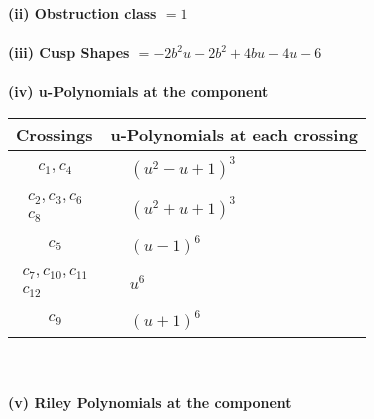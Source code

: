 \documentclass[1p]{elsarticle_modified}
\theoremstyle{definition}
\begin{document}
\flushleft \textbf{(ii) Obstruction class $= 1$}\\~\\
\flushleft \textbf{(iii) Cusp Shapes $= -2 b^2 u-2 b^2+4 b u-4 u-6$}\\~\\
\newpage\renewcommand{\arraystretch}{1}
\flushleft \textbf{(iv) u-Polynomials at the component}\newline \\
\begin{tabular}{m{50pt}|m{274pt}}
Crossings & \hspace{64pt}u-Polynomials at each crossing \\
\hline $$\begin{aligned}c_{1},c_{4}\end{aligned}$$&$\begin{aligned}
&(u^2- u+1)^3
\end{aligned}$\\
\hline $$\begin{aligned}c_{2},c_{3},c_{6}\\c_{8}\end{aligned}$$&$\begin{aligned}
&(u^2+u+1)^3
\end{aligned}$\\
\hline $$\begin{aligned}c_{5}\end{aligned}$$&$\begin{aligned}
&(u-1)^6
\end{aligned}$\\
\hline $$\begin{aligned}c_{7},c_{10},c_{11}\\c_{12}\end{aligned}$$&$\begin{aligned}
&u^6
\end{aligned}$\\
\hline $$\begin{aligned}c_{9}\end{aligned}$$&$\begin{aligned}
&(u+1)^6
\end{aligned}$\\
\hline
\end{tabular}\\~\\
\newpage\renewcommand{\arraystretch}{1}
\flushleft \textbf{(v) Riley Polynomials at the component}\newline \\
\end{document}
